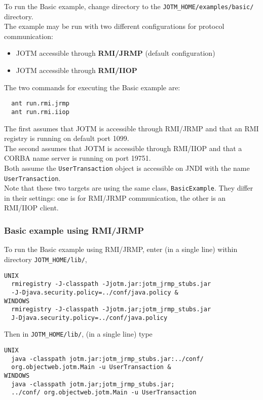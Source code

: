 \documentclass[a4paper,11pt]{article}
\begin{document}
To run the Basic example, change directory to the \texttt{JOTM\_HOME/examples/basic/}
directory.\\
The example may be run with two different configurations for
protocol communication:
\begin{itemize}
\item JOTM accessible through \textbf{RMI/JRMP} (default configuration)
\item JOTM accessible through \textbf{RMI/IIOP}
\end{itemize}

\noindent The two commands for executing the Basic example are:
\begin{verbatim}
  ant run.rmi.jrmp
  ant run.rmi.iiop
\end{verbatim}

\noindent The first assumes that JOTM is accessible through RMI/JRMP and
that an RMI registry is running on default port 1099.\\
The second assumes that JOTM is accessible through RMI/IIOP and
that a CORBA name server is running on port 19751.\\
Both assume the \texttt{UserTransaction} object is
accessible on JNDI with the name \texttt{UserTransaction}.\\

\noindent Note that these two targets are using the same
class, \texttt{BasicExample}. They differ in their settings: one is
for RMI/JRMP communication, the other is an RMI/IIOP client.

\subsubsection{Basic example using RMI/JRMP}
To run the Basic example using RMI/JRMP, enter (in a single line)
 within directory \texttt{JOTM\_HOME/lib/},
\begin{verbatim}
UNIX
  rmiregistry -J-classpath -Jjotm.jar:jotm_jrmp_stubs.jar 
  -J-Djava.security.policy=../conf/java.policy &
WINDOWS
  rmiregistry -J-classpath -Jjotm.jar;jotm_jrmp_stubs.jar
  J-Djava.security.policy=../conf/java.policy
\end{verbatim}
Then in \texttt{JOTM\_HOME/lib/}, (in a single line) type
\begin{verbatim}
UNIX
  java -classpath jotm.jar:jotm_jrmp_stubs.jar:../conf/ 
  org.objectweb.jotm.Main -u UserTransaction &
WINDOWS
  java -classpath jotm.jar;jotm_jrmp_stubs.jar; 
  ../conf/ org.objectweb.jotm.Main -u UserTransaction

\end{verbatim}
\end{document}

